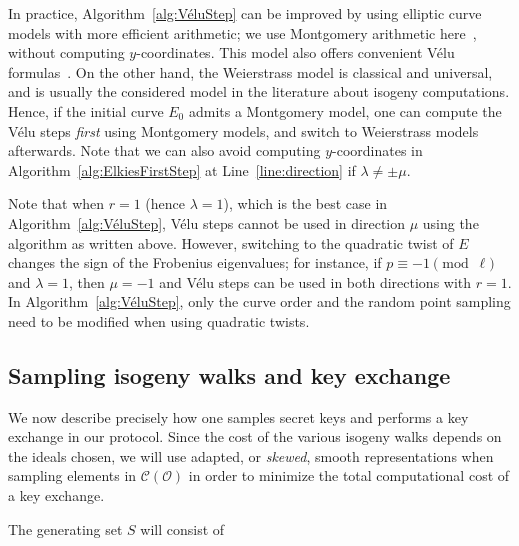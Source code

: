 \documentclass{llncs}
\newcommand{\Cl}{\mathcal{C}}
\renewcommand{\O}{\mathcal{O}}
\begin{document}
In practice, Algorithm~\ref{alg:VéluStep} can be improved
by using elliptic curve models with more efficient arithmetic;
we use Montgomery arithmetic here~\cite{Montgomery87,CostelloSmith2017},
without computing $y$-coordinates. This model also
offers convenient Vélu formulas~\cite{Renes2018}.
On the other hand, the Weierstrass model is classical and universal, 
and is usually the considered model in the literature
about isogeny computations.
Hence, if the initial curve $E_0$ admits a Montgomery model, one can
compute the Vélu steps \emph{first} using Montgomery models,
and switch to Weierstrass models afterwards. Note that
we can also avoid computing $y$-coordinates in
Algorithm~\ref{alg:ElkiesFirstStep}
at Line~\ref{line:direction} if $\lambda\neq\pm\mu$.

\begin{remark}
    \label{rem:twist-trick}
    Note that when $r = 1$ (hence $\lambda = 1$), which is the best case
    in Algorithm~\ref{alg:VéluStep}, Vélu steps cannot be used in direction $\mu$
    using the algorithm as written above. However, switching to the quadratic
    twist of $E$ changes the sign of the Frobenius eigenvalues; 
    for instance, if $p \equiv -1\pmod{\ell}$ and $\lambda = 1$, then $\mu=-1$ and
    Vélu steps can be used in both directions with $r=1$.
    In Algorithm~\ref{alg:VéluStep}, only the curve order
    and the random point sampling need to be modified when using quadratic twists.
\end{remark}

\subsection{Sampling isogeny walks and key exchange}

We now describe precisely how one samples secret keys and performs a key
exchange in our protocol. 
Since the cost of the various isogeny walks depends on the ideals
chosen,
we will use adapted, or \emph{skewed}, 
smooth representations when sampling elements in $\Cl(\O)$
in order to minimize the total computational cost of a key exchange.

The generating set $S$ will consist of
\end{document}
